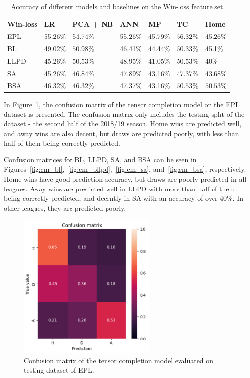\documentclass[thesis=M,english]{FITthesis}[2019/12/23]
\begin{document}
\begin{table}
\begin{center}
\begin{tabular}{|p{}| l | p{} | l | l | l | l |}
 \hline
 Win-loss & LR & PCA + NB & ANN & MF & TC & Home \\ 
 \hline
 EPL & 55.26\% & 54.74\% & 55.26\% & 45.79\% & $\mathbf{56.32\%}$ & 45.26\% \\  
 \hline
 BL & 49.02\% & $\mathbf{50.98\%}$ & 46.41\% & 44.44\% & 50.33\% & 45.1\% \\ 
 \hline
 LLPD & 45.26\% & $\mathbf{50.53\%}$ & 48.95\% & 41.05\% & $\mathbf{50.53\%}$ & 40\% \\  
 \hline
 SA & 45.26\% & 46.84\% & $\mathbf{47.89\%}$ & 43.16\% & 47.37\% & 43.68\% \\ 
 \hline
 BSA & 46.32\% & 46.32\% & 47.37\% & 43.16\% & $\mathbf{50.53\%}$ & $\mathbf{50.53\%}$ \\  
 \hline
\end{tabular}
\caption{Accuracy of different models and baselines on the Win-loss feature set}
\label{table:win_loss}
\end{center}
\end{table}

In Figure~\ref{fig:cm_epl}, the confusion matrix of the tensor completion model on the EPL dataset is presented. The confusion matrix only includes the testing split of the dataset - the second half of the 2018/19 season. Home wins are predicted well, and away wins are also decent, but draws are predicted poorly, with less than half of them being correctly predicted.

Confusion matrices for BL, LLPD, SA, and BSA can be seen in Figures~\ref{fig:cm_bl},~\ref{fig:cm_bllpd},~\ref{fig:cm_sa}, and~\ref{fig:cm_bsa}, respectively. Home wins have good prediction accuracy, but draws are poorly predicted in all leagues. Away wins are predicted well in LLPD with more than half of them being correctly predicted, and decently in SA with an accuracy of over 40\%. In other leagues, they are predicted poorly.

\begin{figure}[h]
    \centering
    \includegraphics[width=0.6\textwidth]{figures/cm_epl.png}
    \caption{Confusion matrix of the tensor completion model evaluated on testing dataset of EPL.}
    \label{fig:cm_epl}
\end{figure}
\end{document}
